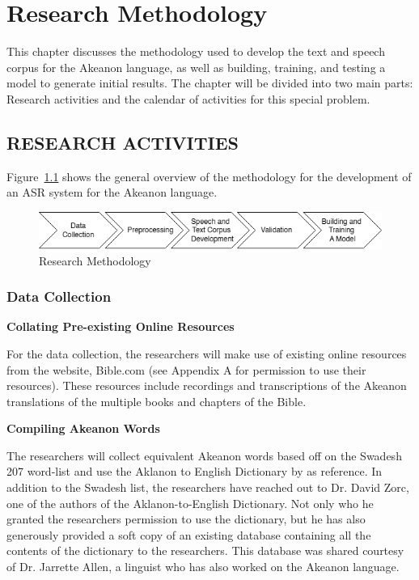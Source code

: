 \chapter{Research Methodology}
This chapter discusses the methodology used to develop the text and speech corpus for the Akeanon language, as well as building, training, and testing a model to generate initial results. The chapter will be divided into two main parts: Research activities and the calendar of activities for this special problem.

\section{RESEARCH ACTIVITIES}
Figure~\ref{fig:flowchart} shows the general overview of the methodology for the development of an ASR system for the Akeanon language.

\begin{figure}[h!]
	\centering
	\includegraphics[width=\textwidth]{./figures/flowchart.png}
   \caption{Research Methodology}
	\label{fig:flowchart}
\end{figure}

\subsection{Data Collection}

\textbf{Collating Pre-existing Online Resources}

For the data collection, the researchers will make use of existing online resources from the website, Bible.com (see Appendix A for permission to use their resources). These resources include recordings and transcriptions of the Akeanon translations of the multiple books and chapters of the Bible.

\textbf{Compiling Akeanon Words}

The researchers will collect equivalent Akeanon words based off on the Swadesh 207 word-list and use the Aklanon to English Dictionary by  as reference. In addition to the Swadesh list, the researchers have reached out to Dr. David Zorc, one of the authors of the Aklanon-to-English Dictionary. Not only who he granted the researchers permission to use the dictionary, but he has also generously provided a soft copy of an existing database containing all the contents of the dictionary to the researchers. This database was shared courtesy of Dr. Jarrette Allen, a linguist who has also worked on the Akeanon language.


